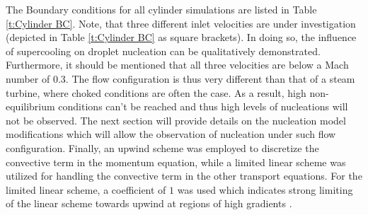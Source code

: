\documentclass[12pt]{article}
\numberwithin{equation}{section}
\begin{document}
The Boundary conditions for all cylinder simulations are listed in Table \ref{t:Cylinder BC}. Note, that three different inlet velocities are under investigation (depicted in Table \ref{t:Cylinder BC} as square brackets). In doing so, the influence of supercooling on droplet nucleation can be qualitatively demonstrated. Furthermore, it should be mentioned that all three velocities are below a Mach number of $0.3$. The flow configuration is thus very different than that of a steam turbine, where choked conditions are often the case. As a result, high non-equilibrium conditions can't be reached and thus high levels of nucleations will not be observed. The next section will provide details on the nucleation model modifications which will allow the observation of nucleation under such flow configuration. Finally, an upwind scheme was employed to discretize the convective term in the momentum equation, while a limited linear scheme was utilized for handling the convective term in the other transport equations. For the limited linear scheme, a coefficient of $1$ was used which indicates strong limiting of the linear scheme towards upwind at regions of high gradients \cite{greenshields2022}.
\end{document}
